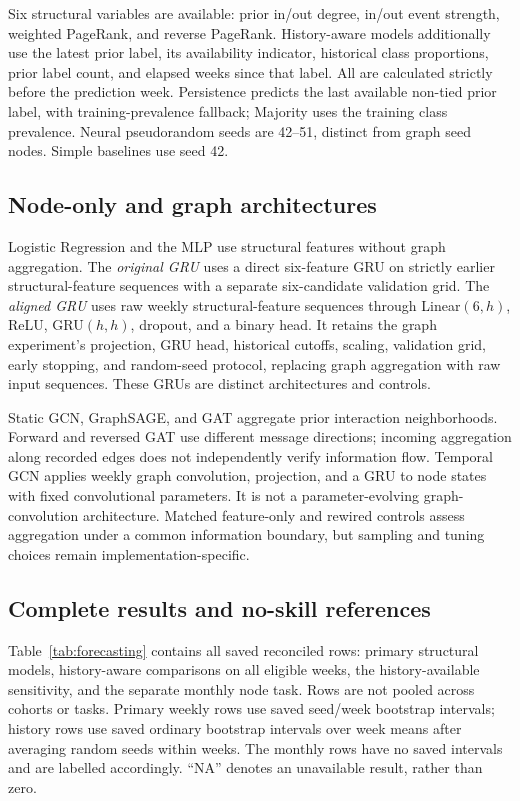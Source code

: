\documentclass[11pt,a4paper]{article}
\begin{document}
Six structural variables are available: prior in/out degree, in/out event strength, weighted PageRank, and reverse PageRank. History-aware models additionally use the latest prior label, its availability indicator, historical class proportions, prior label count, and elapsed weeks since that label. All are calculated strictly before the prediction week. Persistence predicts the last available non-tied prior label, with training-prevalence fallback; Majority uses the training class prevalence. Neural pseudorandom seeds are 42--51, distinct from graph seed nodes. Simple baselines use seed 42.

\subsection{Node-only and graph architectures}
Logistic Regression and the MLP use structural features without graph aggregation. The \emph{original GRU} uses a direct six-feature GRU on strictly earlier structural-feature sequences with a separate six-candidate validation grid. The \emph{aligned GRU} uses raw weekly structural-feature sequences through Linear$(6,h)$, ReLU, GRU$(h,h)$, dropout, and a binary head. It retains the graph experiment's projection, GRU head, historical cutoffs, scaling, validation grid, early stopping, and random-seed protocol, replacing graph aggregation with raw input sequences. These GRUs are distinct architectures and controls.

Static GCN, GraphSAGE, and GAT aggregate prior interaction neighborhoods. Forward and reversed GAT use different message directions; incoming aggregation along recorded edges does not independently verify information flow. Temporal GCN applies weekly graph convolution, projection, and a GRU to node states with fixed convolutional parameters. It is not a parameter-evolving graph-convolution architecture. Matched feature-only and rewired controls assess aggregation under a common information boundary, but sampling and tuning choices remain implementation-specific.

\subsection{Complete results and no-skill references}
Table~\ref{tab:forecasting} contains all saved reconciled rows: primary structural models, history-aware comparisons on all eligible weeks, the history-available sensitivity, and the separate monthly node task. Rows are not pooled across cohorts or tasks. Primary weekly rows use saved seed/week bootstrap intervals; history rows use saved ordinary bootstrap intervals over week means after averaging random seeds within weeks. The monthly rows have no saved intervals and are labelled accordingly. ``NA'' denotes an unavailable result, rather than zero.
\end{document}
